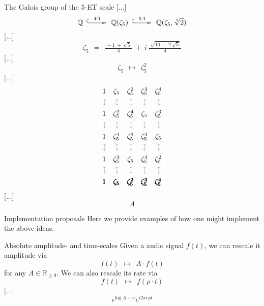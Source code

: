 \documentclass[letterpaper,11pt, reqno]{amsart}
\makeatletter
\newtheorem{monodromy theorem}{Monodromy Theorem}[subsection]
\newtheorem{research objectives}{Research objectives}[subsection]
\newtheorem{research question}[theorem]{Research questions}
\newtheorem{aside question}[theorem]{Aside question}
\newtheorem{blank remark}[theorem]{}
\newtheorem{terminology and comment}[theorem]{Terminology and comment}
\newtheorem{purity hypothesis}[theorem]{Purity hypothesis}
\newtheorem{corollary of the purity hypothesis}[theorem]{Corollary of the purity hypothesis}
\newcommand{\QQ} {{\mathbb Q}}
\newcommand{\RR} {{\mathbb R}}
\newcommand{\mono}{\!\xymatrix{{}\ar@{^{(}->}[r]&{}}\!}
\numberwithin{equation}{theorem}
\makeatother
\begin{document}
\begin{section}{The Galois group of the 5-ET scale}
[...]
	$$
	\QQ\ \overset{4:1}{\mono}\ \QQ(\zeta_5)\ \overset{5:1}{\mono}\ \QQ(\zeta_5, \sqrt[5]{2})
	$$
[...]
	$$
	\zeta_{5}
	\ \ =\ \ 
	\tfrac{\ -1\ \!+\ \!\sqrt{5}\ }{4}\ +\ i\ \tfrac{\ \sqrt{10\ \!+\ \!2\ \!\sqrt{5}}\ }{4}
	$$
[...]
	$$
	\zeta_5\ \ \longmapsto\ \ \zeta^2_5
	$$
[...]
	$$
	\begin{array}{ccccc}
	1 & \zeta_5 & \zeta^2_5 & \zeta^3_5 & \zeta^4_5 \\[-4pt]
	{\color{gray!75}\rotatebox{-90}{$\mapsto$}} & {\color{gray!75}\rotatebox{-90}{$\mapsto$}} & {\color{gray!75}\rotatebox{-90}{$\mapsto$}} & {\color{gray!75}\rotatebox{-90}{$\mapsto$}} & {\color{gray!75}\rotatebox{-90}{$\mapsto$}} \\[12pt]
	1 & \zeta^2_5 & \zeta^4_5 & \zeta_5 & \zeta^3_5 \\[-4pt]
	{\color{gray!75}\rotatebox{-90}{$\mapsto$}} & {\color{gray!75}\rotatebox{-90}{$\mapsto$}} & {\color{gray!75}\rotatebox{-90}{$\mapsto$}} & {\color{gray!75}\rotatebox{-90}{$\mapsto$}} & {\color{gray!75}\rotatebox{-90}{$\mapsto$}} \\[12pt]
	1 & \zeta^4_5 & \zeta^3_5 & \zeta^2_5 & \zeta_5 \\[-4pt]
	{\color{gray!75}\rotatebox{-90}{$\mapsto$}} & {\color{gray!75}\rotatebox{-90}{$\mapsto$}} & {\color{gray!75}\rotatebox{-90}{$\mapsto$}} & {\color{gray!75}\rotatebox{-90}{$\mapsto$}} & {\color{gray!75}\rotatebox{-90}{$\mapsto$}} \\[12pt]
	1 & \zeta^3_5 & \zeta_5 & \zeta^4_5 & \zeta^2_5 \\[-4pt]
	{\color{gray!75}\rotatebox{-90}{$\mapsto$}} & {\color{gray!75}\rotatebox{-90}{$\mapsto$}} & {\color{gray!75}\rotatebox{-90}{$\mapsto$}} & {\color{gray!75}\rotatebox{-90}{$\mapsto$}} & {\color{gray!75}\rotatebox{-90}{$\mapsto$}} \\[12pt]
	\pmb{1} & \pmb{\zeta_5} & \pmb{\zeta^2_5} & \pmb{\zeta^3_5} & \pmb{\zeta^4_5}
	\end{array}
	$$
[...]
	$$
	A
	$$
\end{section}

\begin{section}{Implementation proposals}
Here we provide examples of how one might implement the above ideas.

\begin{subsection}{Absolute amplitude- and time-scales}
Given a audio signal $f(t)$, we can rescale it amplitude via
	$$
	f(t)
	\ \ \longmapsto\ \ 
	A\cdot f(t)
	$$
for any $A\in\RR_{\ge 0}$. We can also rescale its rate via
	$$
	f(t)
	\ \ \longmapsto\ \ 
	f(\rho\cdot t)
	$$
[...]
	$$
	e^{\text{log}\ \!A+u}e^{i2\pi v\rho t}
	$$
	
\end{subsection}

\end{section}

\vskip 1cm



\end{document}
